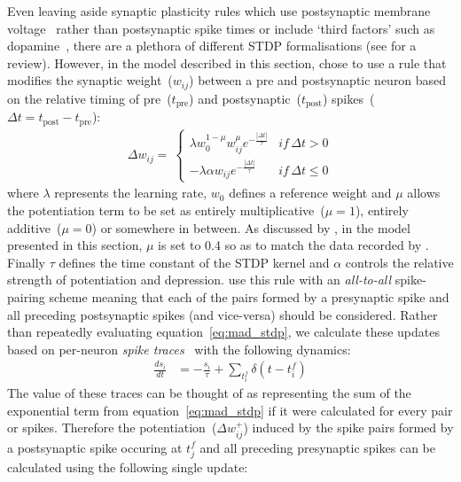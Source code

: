\documentclass[utf8]{frontiersSCNS} %
\begin{document}
Even leaving aside synaptic plasticity rules which use postsynaptic membrane voltage~\citep{Brader2007,Clopath2010c} rather than postsynaptic spike times or include `third factors' such as dopamine~\citep{Izhikevich2007}, there are a plethora of different STDP formalisations (see \citet{Morrison2008} for a review).
However, in the model described in this section, \citet{Morrison2007} chose to use a rule that modifies the synaptic weight~($w_{ij}$) between a pre and postsynaptic neuron based on the relative timing of pre~($t_{\text{pre}}$) and postsynaptic~($t_{\text{post}}$) spikes~($\Delta t = t_{\text{post}} - t_{\text{pre}}$):
%
\begin{align}
    \Delta w_{ij} = \
        \begin{cases}
            \lambda w_{0}^{1-\mu} w_{ij}^{\mu} e^{-\frac{|\Delta t|}{\tau}} & if\, \Delta t>0\\
            -\lambda \alpha w_{ij} e^{-\frac{|\Delta t|}{\tau}}             & if\, \Delta t\leq0
        \end{cases}\label{eq:mad_stdp}
\end{align}
%
where $\lambda$ represents the learning rate, $w_{0}$ defines a reference weight and $\mu$ allows the potentiation term to be set as entirely multiplicative~($\mu=1$), entirely additive~($\mu=0$) or somewhere in between.
As discussed by \citet{Morrison2007}, in the model presented in this section, $\mu$ is set to \num{0.4} so as to match the data recorded by \citet{Bi1998}.
Finally $\tau$ defines the time constant of the STDP kernel and $\alpha$ controls the relative strength of potentiation and depression.
\citeauthor{Morrison2007} use this rule with an \textit{all-to-all} spike-pairing scheme meaning that each of the pairs formed by a presynaptic spike and all preceding postsynaptic spikes (and vice-versa) should be considered.
Rather than repeatedly evaluating equation~\ref{eq:mad_stdp}, we calculate these updates based on per-neuron \textit{spike traces}~\citep{Song2000, Morrison2007} with the following dynamics:
%
\begin{align}
    \frac{ds_{i}}{dt} & = -\frac{s_{i}}{\tau} + \sum_{t_{i}^{f}}\delta(t - t_{i}^{f}) \label{eq:stdp_trace}
\end{align}
%
The value of these traces can be thought of as representing the sum of the exponential term from equation~\ref{eq:mad_stdp} if it were calculated for every pair or spikes.
Therefore the potentiation~($\Delta w_{ij}^{+}$) induced by the spike pairs formed by a postsynaptic spike occuring at $t_{j}^{f}$ and all preceding presynaptic spikes can be calculated using the following single update:
\end{document}
